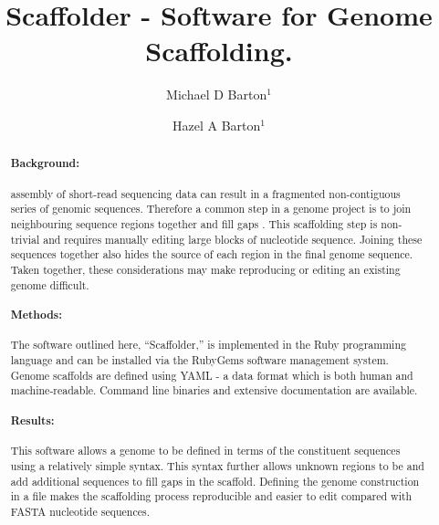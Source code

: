\documentclass[10pt]{bmc_article}
\newenvironment{bmcformat}{\begin{raggedright}\baselineskip20pt\sloppy\setboolean{publ}{false}}{\end{raggedright}\baselineskip20pt\sloppy}
\begin{document}
\begin{bmcformat}

\title{Scaffolder - Software for  Genome
Scaffolding.}

\author{
  Michael D Barton$^{1}$\correspondingauthor%
\and
  Hazel A Barton$^1$%
      }

\address{\iid(1) Department of Biological Sciences, Northern Kentucky %
University, Nunn Drive, Highland Heights, KY 41076 }%

\maketitle

\clearpage

\begin{abstract} %

  \paragraph*{Background:}  assembly of 
  short-read sequencing data can result in a fragmented non-contiguous series
  of genomic sequences. Therefore a common step in a genome project is to join
  neighbouring sequence regions together and fill gaps . This scaffolding step is
  non-trivial and requires manually editing large blocks of nucleotide
  sequence. Joining these sequences together also hides the source of each
  region in the final genome sequence. Taken together, these considerations
  may make reproducing or editing an existing genome 
  difficult.

  \paragraph*{Methods:} The software outlined here, ``Scaffolder,'' is
  implemented in the Ruby programming language and can be installed via the
  RubyGems software management system. Genome scaffolds are defined using YAML
  - a data format\remove{,} which is both human and machine-readable. Command
  line binaries and extensive documentation are available.

  \paragraph*{Results:} This software allows a genome 
  to be defined in terms of the constituent sequences using a relatively simple
  syntax. This syntax further allows unknown
  regions to be  and add additional sequences to
  fill  gaps in the scaffold. Defining the genome construction in
  a file makes the scaffolding process reproducible and easier to edit
  compared with  FASTA nucleotide sequences.


\end{abstract}
\end{bmcformat}
\end{document}
